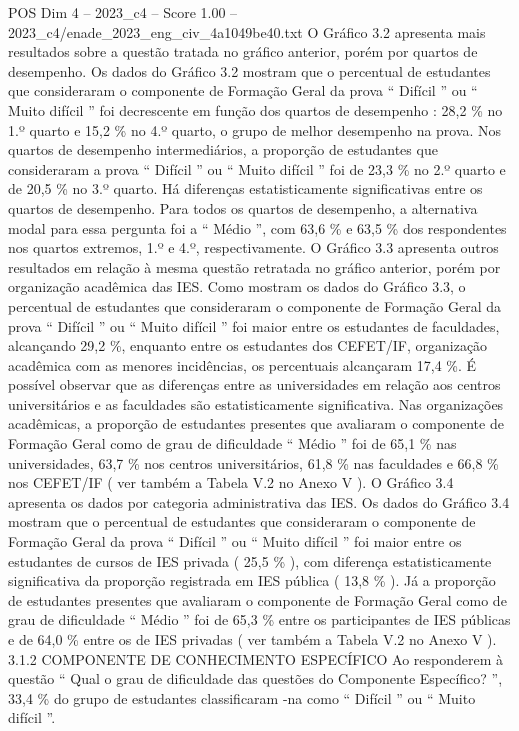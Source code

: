 \begin{textsample}{POS Dim 4 – 2023\_c4 – Score 1.00 – 2023\_c4/enade\_2023\_eng\_civ\_4a1049be40.txt}
O Gráfico 3.2 apresenta mais resultados sobre a questão tratada no gráfico anterior, porém por quartos de desempenho.
Os dados do Gráfico 3.2 mostram que o percentual de estudantes que consideraram o componente de Formação Geral da prova “ Difícil ” ou “ Muito difícil ” foi decrescente em função dos quartos de desempenho : 28,2 \% no 1.º quarto e 15,2 \% no 4.º quarto, o grupo de melhor desempenho na prova.
Nos quartos de desempenho intermediários, a proporção de estudantes que consideraram a prova “ Difícil ” ou “ Muito difícil ” foi de 23,3 \% no 2.º quarto e de 20,5 \% no 3.º quarto.
Há diferenças estatisticamente significativas entre os quartos de desempenho.
Para todos os quartos de desempenho, a alternativa modal para essa pergunta foi a “ Médio ”, com 63,6 \% e 63,5 \% dos respondentes nos quartos extremos, 1.º e 4.º, respectivamente.
O Gráfico 3.3 apresenta outros resultados em relação à mesma questão retratada no gráfico anterior, porém por organização acadêmica das IES.
Como mostram os dados do Gráfico 3.3, o percentual de estudantes que consideraram o componente de Formação Geral da prova “ Difícil ” ou “ Muito difícil ” foi maior entre os estudantes de faculdades, alcançando 29,2 \%, enquanto entre os estudantes dos CEFET/IF, organização acadêmica com as menores incidências, os percentuais alcançaram 17,4 \%.
É possível observar que as diferenças entre as universidades em relação aos centros universitários e as faculdades são estatisticamente significativa.
Nas organizações acadêmicas, a proporção de estudantes presentes que avaliaram o componente de Formação Geral como de grau de dificuldade “ Médio ” foi de 65,1 \% nas universidades, 63,7 \% nos centros universitários, 61,8 \% nas faculdades e 66,8 \% nos CEFET/IF ( ver também a Tabela V.2 no Anexo V ).
O Gráfico 3.4 apresenta os dados por categoria administrativa das IES.
Os dados do Gráfico 3.4 mostram que o percentual de estudantes que consideraram o componente de Formação Geral da prova “ Difícil ” ou “ Muito difícil ” foi maior entre os estudantes de cursos de IES privada ( 25,5 \% ), com diferença estatisticamente significativa da proporção registrada em IES pública ( 13,8 \% ).
Já a proporção de estudantes presentes que avaliaram o componente de Formação Geral como de grau de dificuldade “ Médio ” foi de 65,3 \% entre os participantes de IES públicas e de 64,0 \% entre os de IES privadas ( ver também a Tabela V.2 no Anexo V ). 3.1.2 COMPONENTE DE CONHECIMENTO ESPECÍFICO Ao responderem à questão “ Qual o grau de dificuldade das questões do Componente Específico? ”, 33,4 \% do grupo de estudantes classificaram -na como “ Difícil ” ou “ Muito difícil ”.

\end{textsample}
